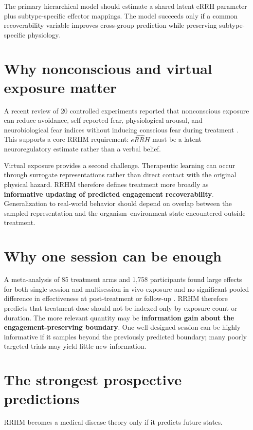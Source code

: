 \documentclass[10pt]{article}
\begin{document}
The primary hierarchical model should estimate a shared latent eRRH parameter plus subtype-specific effector mappings. The model succeeds only if a common recoverability variable improves cross-group prediction while preserving subtype-specific physiology.

\section{Why nonconscious and virtual exposure matter}
A recent review of 20 controlled experiments reported that nonconscious exposure can reduce avoidance, self-reported fear, physiological arousal, and neurobiological fear indices without inducing conscious fear during treatment \cite{siegel2025}. This supports a core RRHM requirement: $\widehat{eRRH}$ must be a latent neuroregulatory estimate rather than a verbal belief.

Virtual exposure provides a second challenge. Therapeutic learning can occur through surrogate representations rather than direct contact with the original physical hazard. RRHM therefore defines treatment more broadly as \textbf{informative updating of predicted engagement recoverability}. Generalization to real-world behavior should depend on overlap between the sampled representation and the organism--environment state encountered outside treatment.

\section{Why one session can be enough}
A meta-analysis of 85 treatment arms and 1,758 participants found large effects for both single-session and multisession in-vivo exposure and no significant pooled difference in effectiveness at post-treatment or follow-up \cite{odgers2022}. RRHM therefore predicts that treatment dose should not be indexed only by exposure count or duration. The more relevant quantity may be \textbf{information gain about the engagement-preserving boundary}. One well-designed session can be highly informative if it samples beyond the previously predicted boundary; many poorly targeted trials may yield little new information.

\section{The strongest prospective predictions}
RRHM becomes a medical disease theory only if it predicts future states.
\end{document}

